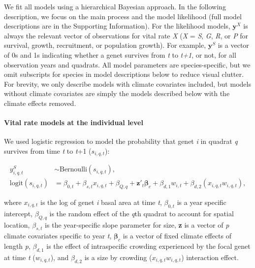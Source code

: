 \documentclass[12pt,]{article}
\let\oldparagraph\paragraph
\renewcommand{\paragraph}[1]{\oldparagraph{#1}\mbox{}}
\begin{document}
We fit all models using a hierarchical Bayesian approach. In the
following description, we focus on the main process and the model
likelihood (full model descriptions are in the Supporting Information).
For the likelihood models, \(\textbf{y}^X\) is always the relevant
vector of observations for vital rate \emph{X} (\emph{X} = \emph{S},
\emph{G}, \emph{R}, or \emph{P} for survival, growth, recruitment, or
population growth). For example, \(\textbf{y}^S\) is a vector of 0s and
1s indicating whether a genet survives from \emph{t} to \emph{t+1}, or
not, for all observation years and quadrats. All model parameters are
species-specific, but we omit subscripts for species in model
descriptions below to reduce visual clutter. For brevity, we only
describe models with climate covariates included, but models without
climate covariates are simply the models described below with the
climate effects removed.

\paragraph{Vital rate models at the individual
level}\label{vital-rate-models-at-the-individual-level}

We used logistic regression to model the probability that genet \emph{i}
in quadrat \emph{q} survives from time \emph{t} to \emph{t}+1
(\(s_{i,q,t}\)):

\vspace{-3em}\begin{align}
y_{i,q,t}^{S} &\sim \text{Bernoulli}(s_{i,q,t}), \\
\text{logit}(s_{i,q,t}) &= \beta_{0,t} + \beta_{s,t}x_{i,q,t} + \beta_{Q,q} + \textbf{z}'_t \boldsymbol{\beta}_c + \beta_{d,1} w_{i,t} + \beta_{d,2} (x_{i,q,t}w_{i,q,t}),
\end{align}\vspace{-3em}

where \(x_{i,q,t}\) is the log of genet \emph{i} basal area at time
\emph{t}, \(\beta_{0,t}\) is a year specific intercept, \(\beta_{Q,q}\)
is the random effect of the \emph{q}th quadrat to account for spatial
location, \(\beta_{s,t}\) is the year-specific slope parameter for size,
\textbf{z} is a vector of \emph{p} climate covariates specific to year
\emph{t}, \(\boldsymbol{\beta}_c\) is a vector of fixed climate effects
of length \emph{p}, \(\beta_{d,1}\) is the effect of intraspecific
crowding experienced by the focal genet at time \emph{t}
(\(w_{i,q,t}\)), and \(\beta_{d,2}\) is a size by crowding
(\(x_{i,q,t}w_{i,q,t}\)) interaction effect.
\end{document}
